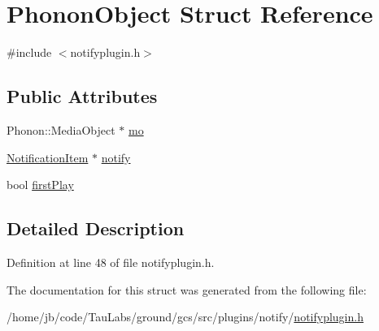 \hypertarget{struct_phonon_object}{\section{\-Phonon\-Object \-Struct \-Reference}
\label{struct_phonon_object}
}


{\ttfamily \#include $<$notifyplugin.\-h$>$}

\subsection*{\-Public \-Attributes}
\begin{DoxyCompactItemize}
\item 
\-Phonon\-::\-Media\-Object $\ast$ \hyperlink{group___notify_plugin_ga3b35d975a7599cd263b275559734e54d}{mo}
\item 
\hyperlink{class_notification_item}{\-Notification\-Item} $\ast$ \hyperlink{group___notify_plugin_ga82a15e7062562dabd14047b2e5398889}{notify}
\item 
bool \hyperlink{group___notify_plugin_ga86b5c4ceede5297e656149cd1f1af3fe}{first\-Play}
\end{DoxyCompactItemize}


\subsection{\-Detailed \-Description}


\-Definition at line 48 of file notifyplugin.\-h.



\-The documentation for this struct was generated from the following file\-:\begin{DoxyCompactItemize}
\item 
/home/jb/code/\-Tau\-Labs/ground/gcs/src/plugins/notify/\hyperlink{notifyplugin_8h}{notifyplugin.\-h}\end{DoxyCompactItemize}
